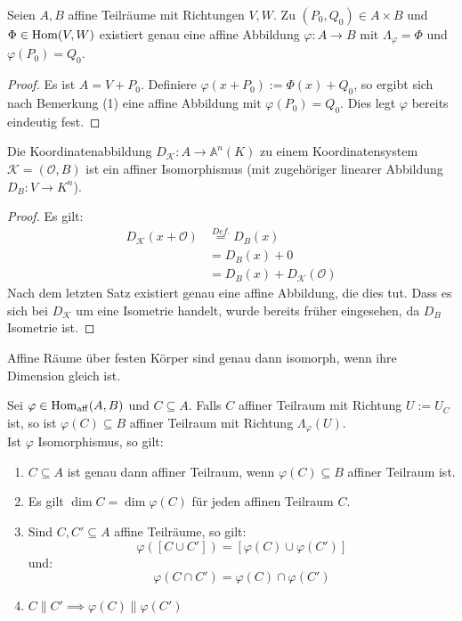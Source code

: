 \documentclass[parskip,a4paper,twoside,DIV15,BCOR12mm]{scrbook}
\begin{document}
\begin{theo}
Seien $A,B$ affine Teilräume mit Richtungen $V,W$.
Zu $(P_0,Q_0)\in A\times B$ und $\Phi\in\operatorname{Hom}(V,W)$ existiert genau eine affine Abbildung
$\varphi:A\to B$ mit $\Lambda_\varphi=\Phi$ und $\varphi(P_0)=Q_0$.
\end{theo}

\begin{proof}
Es ist $A=V+P_0$. Definiere $\varphi(x+P_0):=\Phi(x)+Q_0$, so ergibt sich nach Bemerkung (1)
eine affine Abbildung mit $\varphi(P_0)=Q_0$. Dies legt $\varphi$ bereits eindeutig fest.
\end{proof}

\begin{theo}
Die Koordinatenabbildung $D_\mathcal{K}:A\to\mathbb{A}^n(K)$ zu einem Koordinatensystem 
$\mathcal{K}=(\mathcal{O},B)$ ist ein affiner Isomorphismus (mit zugehöriger linearer Abbildung
$D_B:V\to K^n$).
\end{theo}

\begin{proof}
Es gilt:
\begin{align*}
D_\mathcal{K}(x+\mathcal{O})&\stackrel{Def.}{=} D_B(x)\\
&= D_B(x)+0\\
&= D_B(x)+D_\mathcal{K}(\mathcal{O})
\end{align*}
Nach dem letzten Satz existiert genau eine affine Abbildung, die dies tut.
Dass es sich bei $D_\mathcal{K}$ um eine Isometrie handelt, wurde bereits früher eingesehen,
da $D_B$ Isometrie ist.
\end{proof}

\begin{corollary}
Affine Räume über festen Körper sind genau dann isomorph, wenn ihre Dimension gleich ist.
\end{corollary}

\begin{theo}
Sei $\varphi\in\operatorname{Hom_{aff}}(A,B)$ und $C\subseteq A$.
Falls $C$ affiner Teilraum  mit Richtung $U:=U_C$ ist, so ist $\varphi(C)\subseteq B$
affiner Teilraum mit Richtung $\Lambda_\varphi(U)$.\\
Ist $\varphi$ Isomorphismus, so gilt:
\begin{enumerate}
\item $C\subseteq A$ ist genau dann affiner Teilraum, wenn $\varphi(C)\subseteq B$ affiner Teilraum ist.
\item Es gilt $\dim C = \dim \varphi(C)$ für jeden affinen Teilraum $C$.
\item Sind $C,C'\subseteq A$ affine Teilräume, so gilt:
\[\varphi([C\cup C'])=[\varphi(C)\cup\varphi(C')]\]
und:
\[\varphi(C\cap C')=\varphi(C)\cap\varphi(C')\]
\item $C\parallel C' \implies \varphi(C)\parallel\varphi(C')$
\end{enumerate}
\end{theo}
\end{document}
